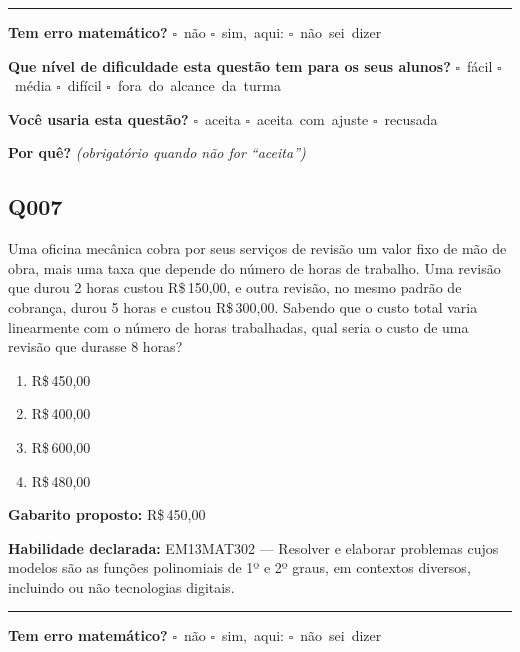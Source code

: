 \documentclass[11pt,a4paper]{article}
\begin{document}
\noindent\rule{\linewidth}{0.4pt}
\textbf{Tem erro matemático?}\quad
\mbox{$\square$~não} \quad \mbox{$\square$~sim, aqui:} \underline{\hspace{5cm}}
\quad \mbox{$\square$~não sei dizer}

\textbf{Que nível de dificuldade esta questão tem para os seus alunos?}\quad
\mbox{$\square$~fácil} \quad \mbox{$\square$~média} \quad
\mbox{$\square$~difícil} \quad \mbox{$\square$~fora do alcance da turma}

\textbf{Você usaria esta questão?}\quad
\mbox{$\square$~aceita} \quad \mbox{$\square$~aceita com ajuste} \quad
\mbox{$\square$~recusada}

\textbf{Por quê?} \emph{(obrigatório quando não for ``aceita'')}

\underline{\hspace{\linewidth}}

\underline{\hspace{\linewidth}}
\vspace{0.6em}

\begin{samepage}
\subsection*{Q007}
Uma oficina mecânica cobra por seus serviços de revisão um valor fixo de mão de obra, mais uma taxa que depende do número de horas de trabalho. Uma revisão que durou 2 horas custou R\$\,150,00, e outra revisão, no mesmo padrão de cobrança, durou 5 horas e custou R\$\,300,00. Sabendo que o custo total varia linearmente com o número de horas trabalhadas, qual seria o custo de uma revisão que durasse 8 horas?
\begin{enumerate}[label=(\alph*),nosep,leftmargin=*]
\item R\$\,450,00
\item R\$\,400,00
\item R\$\,600,00
\item R\$\,480,00
\end{enumerate}

\textbf{Gabarito proposto:} R\$\,450,00

\textbf{Habilidade declarada:} EM13MAT302 --- Resolver e elaborar problemas cujos modelos são as funções polinomiais de 1º e 2º graus, em contextos diversos, incluindo ou não tecnologias digitais.
\end{samepage}

\noindent\rule{\linewidth}{0.4pt}
\textbf{Tem erro matemático?}\quad
\mbox{$\square$~não} \quad \mbox{$\square$~sim, aqui:} \underline{\hspace{5cm}}
\quad \mbox{$\square$~não sei dizer}
\end{document}
